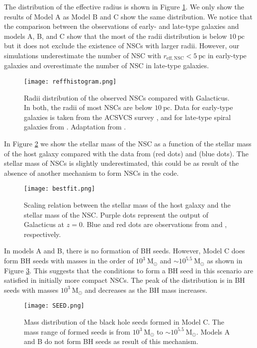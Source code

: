 \documentclass[baaa]{baaa}
\begin{document}
The distribution of the effective radius is shown in Figure \ref{Reff}. We only show the results of Model A as Model B and C show the same distribution. We notice that the comparison between the observations of early- and late-type galaxies and models A, B, and C show that the most of the radii distribution is below $10~\mathrm{pc}$ but it does not exclude the existence of NSCs with larger radii.
However, our simulations underestimate the number of NSC with $r_\mathrm{eff,NSC} < 5~\mathrm{pc}$  in early-type galaxies and overestimate the number of NSC in late-type galaxies.

\begin{figure}[!t]
\texttt{[image: reffhistogram.png]}
\caption{Radii distribution of the observed NSCs compared with {\sc Galacticus}. In both, the radii of most NSCs are below $10~\mathrm{pc}$. Data for early-type galaxies is taken from the ACSVCS survey \cite{COTE2006}, and
for late-type spiral galaxies from \cite{GEORGIEV2016}. Adaptation from \cite{NEUMAYER2020}.}\label{Reff}
\end{figure}

In Figure \ref{Scale} we show the stellar mass of the NSC as a function of the stellar mass of the host galaxy compared with the data from \cite{SPENGLER2017} (red dots) and \cite{GEORGIEV2016} (blue dots). The stellar mass of NSCs is slightly underestimated, this could be as result of the absence of another mechanism to form NSCs in the code.

\begin{figure}[!t]
\texttt{[image: bestfit.png]}
\caption{Scaling relation between the stellar mass of the host galaxy and the stellar mass of the NSC. Purple dots represent the output of {\sc Galacticus} at $z=0$. Blue and red dots are observations from \cite{GEORGIEV2016} and \cite{SPENGLER2017}, respectively. }\label{Scale}
\end{figure}

In models A and B, there is no formation of BH seeds. However, Model C does form BH seeds with masses in the order of $10^{3}~\mathrm{M}_\odot$ and $\sim 10^{5.5}~\mathrm{M}_\odot$ as shown in Figure \ref{seed}. 
This suggests that the conditions to form a BH seed in this scenario are satisfied in initially more compact NSCs. The peak of the distribution is in BH seeds with masses $10^{3}~\mathrm{M}_\odot$ and decreases as the BH mass increases.

\begin{figure}[!t]
\texttt{[image: SEED.png]}
\caption{Mass distribution of the  black hole seeds formed in Model C. The mass range of formed seeds is from $10^{3}~\mathrm{M}_\odot$ to $\sim 10^{5.5}~ \mathrm{M}_\odot$.
Models A and B do not form BH seeds as result of this mechanism.}\label{seed}
\end{figure}
\end{document}
